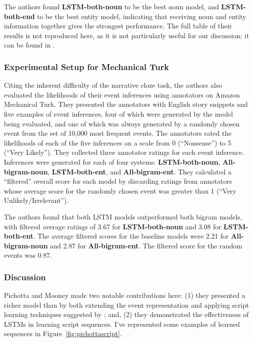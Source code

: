 The authors found \textbf{LSTM-both-noun} to be the best noun model, and \textbf{LSTM-both-end} to be the best entity model, indicating that receiving noun and entity information together gives the strongest performance. The full table of their results is not reproduced here, as it is not particularly useful for our discussion; it can be found in \citep{pichotta2016learning}.

\subsubsection{Experimental Setup for Mechanical Turk}
Citing the inherent difficulty of the narrative cloze task, the authors also evaluated the likelihoods of their event inferences using annotators on Amazon Mechanical Turk. They presented the annotators with English story snippets and five examples of event inferences, four of which were generated by the model being evaluated, and one of which was always generated by a randomly chosen event from the set of 10,000 most frequent events. The annotators rated the likelihoods of each of the five inferences on a scale from 0 (``Nonsense'') to 5 (``Very Likely''). They collected three annotator ratings for each event inference. Inferences were generated for each of four systems: \textbf{LSTM-both-noun}, \textbf{All-bigram-noun}, \textbf{LSTM-both-ent}, and \textbf{All-bigram-ent}. They calculated a ``filtered'' overall score for each model by discarding ratings from annotators whose average score for the randomly chosen event was greater than 1 (``Very Unlikely/Irrelevant'').

The authors found that both LSTM models outperformed both bigram models, with filtered average ratings of 3.67 for \textbf{LSTM-both-noun} and 3.08 for \textbf{LSTM-both-ent}. The average filtered scores for the baseline models were 2.21 for \textbf{All-bigram-noun} and 2.87 for \textbf{All-bigram-ent}. The filtered score for the random events was 0.87.

\subsubsection{Discussion}
Pichotta and Mooney made two notable contributions here: (1) they presented a richer model than \citep{chambers2008unsupervised} by both extending the event representation and applying script learning techniques suggested by \citep{jans2012skip}; and, (2) they demonstrated the effectiveness of LSTMs in learning script sequences. I've represented some examples of learned sequences in Figure~\ref{fig:pichottascript}.


